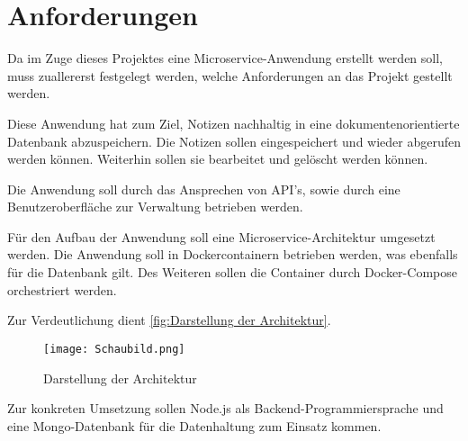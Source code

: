 
\chapter{Anforderungen}
\label{ch:Anforderungen}
Da im Zuge dieses Projektes eine Microservice-Anwendung erstellt werden soll, muss zuallererst festgelegt werden, welche Anforderungen an das Projekt gestellt werden.

Diese Anwendung hat zum Ziel, Notizen nachhaltig in eine dokumentenorientierte Datenbank abzuspeichern. Die Notizen sollen eingespeichert und wieder abgerufen werden können. Weiterhin sollen sie bearbeitet und gelöscht werden können.

Die Anwendung soll durch das Ansprechen von API's, sowie durch eine Benutzeroberfläche zur Verwaltung betrieben werden.

Für den Aufbau der Anwendung soll eine Microservice-Architektur umgesetzt werden.
Die Anwendung soll in Dockercontainern betrieben werden, was ebenfalls für die Datenbank gilt. Des Weiteren sollen die Container durch Docker-Compose orchestriert werden.

Zur Verdeutlichung dient \autoref{fig:Darstellung der Architektur}.
\begin{center}
\begin{figure}[h!]
\centering
\texttt{[image: Schaubild.png]}
\vspace{1pt}
\caption{Darstellung der Architektur}
\label{fig:Darstellung der Architektur}
\end{figure}
\end{center}
Zur konkreten Umsetzung sollen Node.js als Backend-Programmiersprache und eine Mongo-Datenbank für die Datenhaltung zum Einsatz kommen.

